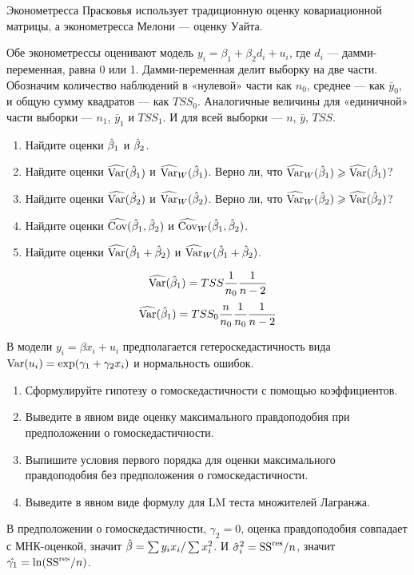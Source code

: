 \begin{problem}
Эконометресса Прасковья использует традиционную оценку ковариационной матрицы, а эконометресса Мелони — оценку Уайта.

Обе эконометрессы оценивают модель $y_i = \beta_1 + \beta_2 d_i + u_i$, где $d_i$ — дамми-переменная, равна 0 или 1. Дамми-переменная делит выборку на две части. Обозначим количество наблюдений в «нулевой» части как $n_0$, среднее — как $\bar y_0$, и общую сумму квадратов — как $TSS_0$. Аналогичные величины для «единичной» части выборки — $n_1$, $\bar y_1$ и $TSS_1$. И для всей выборки — $n$, $\bar y$, $TSS$.


  \begin{enumerate}
    \item Найдите оценки $\hat{\beta}_1$ и $\hat{\beta}_2$.
    \item Найдите оценки $\operatorname{\widehat{\operatorname{Var}}}(\hat{\beta}_1)$ и $\operatorname{\widehat{\operatorname{Var}}}_W(\hat{\beta}_1)$. Верно ли, что $\operatorname{\widehat{\operatorname{Var}}}_W(\hat{\beta}_1) \geqslant \operatorname{\widehat{\operatorname{Var}}}(\hat{\beta}_1)$?
    \item Найдите оценки $\operatorname{\widehat{\operatorname{Var}}}(\hat{\beta}_2)$ и $\operatorname{\widehat{\operatorname{Var}}}_W(\hat{\beta}_2)$. Верно ли, что $\operatorname{\widehat{\operatorname{Var}}}_W(\hat{\beta}_2) \geqslant \operatorname{\widehat{\operatorname{Var}}}(\hat{\beta}_2)$?
    \item Найдите оценки $\operatorname{\widehat{\operatorname{Cov}}}(\hat{\beta}_1, \hat{\beta}_2)$ и $\operatorname{\widehat{\operatorname{Cov}}}_W(\hat{\beta}_1, \hat{\beta}_2)$.
    \item Найдите оценки $\operatorname{\widehat{\operatorname{Var}}}(\hat{\beta}_1 + \hat{\beta}_2)$ и $\operatorname{\widehat{\operatorname{Var}}}_W(\hat{\beta}_1 + \hat{\beta}_2)$.
  \end{enumerate}

\begin{sol}
\[
\operatorname{\widehat{\operatorname{Var}}}(\hat{\beta}_1) = TSS \frac{1}{n_0}\frac{1}{n-2}
\]
\[
\operatorname{\widehat{\operatorname{Var}}}(\hat{\beta}_1) = TSS_0\frac{n}{n_0} \frac{1}{n_0}\frac{1}{n-2}
\]
\end{sol}
\end{problem}



\begin{problem}
В модели $y_i=\beta x_i+u_i$ предполагается гетероскедастичность вида $\operatorname{Var}(u_i)=\exp(\gamma_1+\gamma_2 x_i)$ и нормальность ошибок.
\begin{enumerate}
\item Сформулируйте гипотезу о гомоскедастичности с помощью коэффициентов.
\item Выведите в явном виде оценку максимального правдоподобия при предположении о гомоскедастичности.
\item Выпишите условия первого порядка для оценки максимального правдоподобия без предположения о гомоскедастичности.
\item Выведите в явном виде формулу для LM теста множителей Лагранжа.
\end{enumerate}


\begin{sol}
В предположении о гомоскедастичности, $\gamma_2=0$, оценка правдоподобия совпадает с МНК-оценкой, значит $\hat{\beta}=\sum y_i x_i/ \sum x_i^2$. И $\hat{\sigma}^2_i=\mathrm{SS}^{\text{res}}/n$, значит $\hat{\gamma_1}=\ln(\mathrm{SS}^{\text{res}}/n)$.
\end{sol}
\end{problem}

